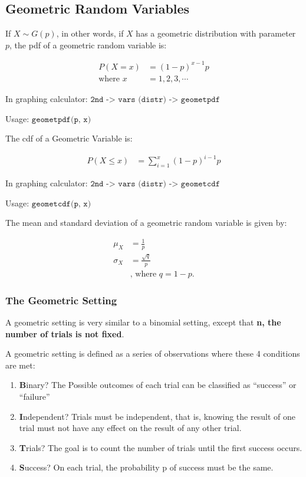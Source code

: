 \documentclass[
]{book}
\begin{document}
\hypertarget{geometric-random-variables}{%
\subsection{Geometric Random Variables}\label{geometric-random-variables}}

If \(X \sim G(p)\), in other words, if \(X\) has a geometric distribution
with parameter \(p\), the pdf of a geometric random variable is:

\[
\begin{aligned}
    P(X=x) &= (1-p)^{x-1}p\\
    \text{where } x &= 1, 2, 3, \cdots
\end{aligned}
\]

In graphing calculator: \(\texttt{2nd -> vars (distr) -> geometpdf}\)

Usage: \(\texttt{geometpdf(p, x)}\)

The cdf of a Geometric Variable is:

\[
\begin{aligned}
    P(X\leq x) &= \sum_{i=1}^x(1-p)^{i-1}p
\end{aligned}
\]

In graphing calculator: \(\texttt{2nd -> vars (distr) -> geometcdf}\)

Usage: \(\texttt{geometcdf(p, x)}\)

The mean and standard deviation of a geometric random variable is given
by:

\[
\begin{aligned}
    \mu_X &= \frac{1}{p} \\
    \sigma_X &= \frac{\sqrt{q}}{p} \\
    &\text{, where } q = 1-p.
\end{aligned}
\]

\hypertarget{the-geometric-setting}{%
\subsubsection{The Geometric Setting}\label{the-geometric-setting}}

A geometric setting is very similar to a binomial setting, except that
\textbf{n, the number of trials is not fixed}.

A geometric setting is defined as a series of observations where these 4
conditions are met:

\begin{enumerate}
\def\labelenumi{\arabic{enumi}.}
\item
  \textbf{B}inary? The Possible outcomes of each trial can be classified as
  ``success'' or ``failure''
\item
  \textbf{I}ndependent? Trials must be independent, that is, knowing the
  result of one trial must not have any effect on the result of any
  other trial.
\item
  \textbf{T}rials? The goal is to count the number of trials until the
  first success occurs.
\item
  \textbf{S}uccess? On each trial, the probability p of success must be the
  same.
\end{enumerate}
\end{document}
